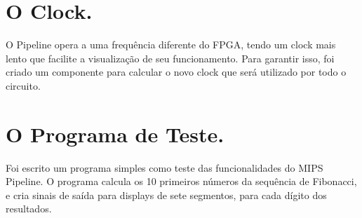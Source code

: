 \documentclass[a4paper, 11pt]{article}
\begin{document}
\section{O Clock.}
    O Pipeline opera a uma frequência diferente do FPGA, tendo um clock mais lento que facilite a visualização de seu funcionamento. Para garantir isso, foi criado um componente para calcular o novo clock que será utilizado por todo o circuito.

\section{O Programa de Teste.}
    Foi escrito um programa simples como teste das funcionalidades do MIPS Pipeline. O 
    programa calcula os 10 primeiros números da sequência de Fibonacci, e cria sinais de
    saída para displays de sete segmentos, para cada dígito dos resultados.
\end{document}
